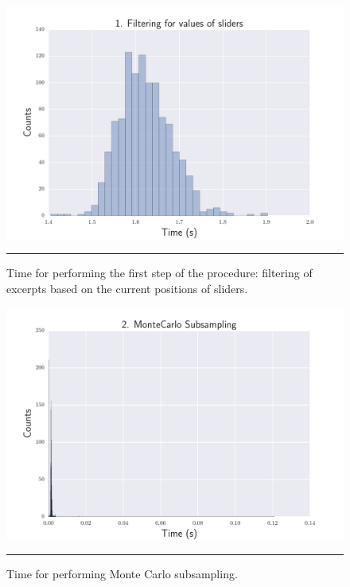 \begin{figure}[h]
\begin{center}
\includegraphics[scale=0.7]{Figures/bench_sliders.pdf}
    \rule{10em}{0.5pt}
  \caption[Time for filtering music in regards to sliders' positions]{Time for performing the first step of the procedure: filtering of excerpts based on the current positions of sliders.}
  \label{fig:step1}
\end{center}
\end{figure}

\begin{figure}[h]
\begin{center}
\includegraphics[scale=0.7]{Figures/bench_subsampling.pdf}
    \rule{10em}{0.5pt}
  \caption[Time for performing Monte Carlo subsampling]{Time for performing Monte Carlo subsampling.}
  \label{fig:step2}
\end{center}
\end{figure}

